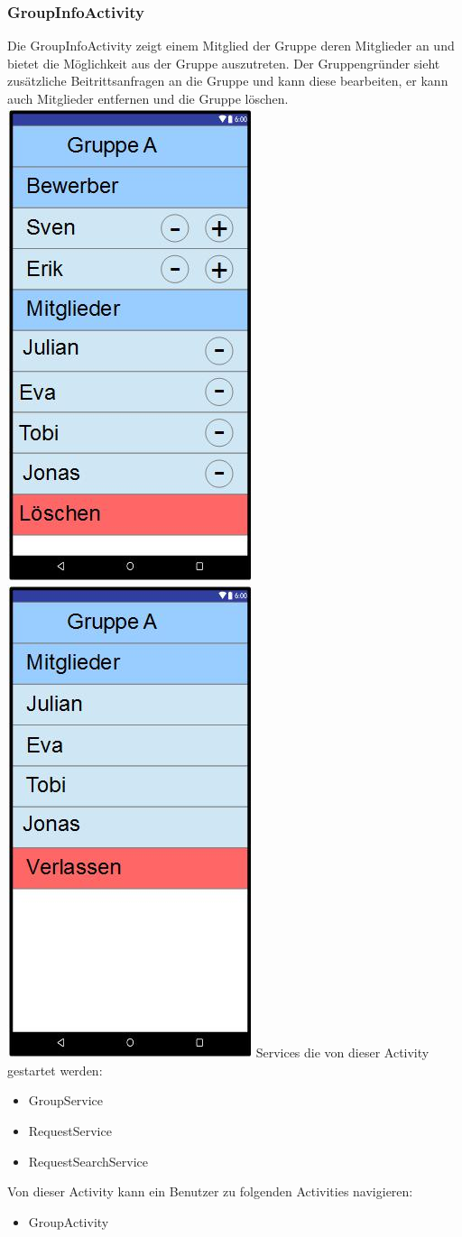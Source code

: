	\subsubsection {GroupInfoActivity}
	Die GroupInfoActivity zeigt einem Mitglied der Gruppe deren Mitglieder an und bietet die Möglichkeit aus der Gruppe auszutreten. Der Gruppengründer sieht zusätzliche Beitrittsanfragen an die Gruppe und kann diese bearbeiten, er kann auch Mitglieder entfernen und die Gruppe löschen.
	\newline
	\includegraphics[width=.3\textwidth]{GUI_GruppeInfoGruender.jpg}
	\includegraphics[width=.3\textwidth]{GUI_GruppeInfoNormal.jpg}
	\newline
	Services die von dieser Activity gestartet werden:
	\begin{itemize}
	\item GroupService
	\item RequestService
	\item RequestSearchService
	\end{itemize}
	Von dieser Activity kann ein Benutzer zu folgenden Activities navigieren:
	\begin{itemize} 
	 \item GroupActivity
	 \end{itemize}
	 
